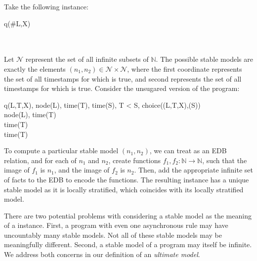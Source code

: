 \begin{example}
Take the following \lang instance:

\begin{Drules}
        {q(\#L,X)} \\
   \\
   \\
\end{Drules}

Let $\mathcal{N}$ represent the set of all infinite subsets of $\mathbb{N}$.  The possible stable models are exactly the elements $(n_1, n_2) \in \mathcal{N} \times \mathcal{N}$, where the first coordinate represents the set of all timestamps for which  is true, and second represents the set of all timestamps for which  is true.  Consider the unsugared version of the program:

\begin{Drules}
        {q(L,T,X), node(L), time(T), time(S), T < S, choice((L,T,X),(S))} \\
        {node(L), time(T)} \\
        {time(T)} \\
        {time(T)}
\end{Drules}

To compute a particular stable model $(n_1,n_2)$, we can treat  as an EDB relation, and for each of $n_1$ and $n_2$, create functions $f_1, f_2 : \mathbb{N} \rightarrow \mathbb{N}$, such that the image of $f_1$ is $n_1$, and the image of $f_2$ is $n_2$.  Then, add the appropriate infinite set of  facts to the EDB to encode the functions.  The resulting instance has a unique stable model as it is locally stratified, which coincides with its locally stratified model.
\end{example}


There are two potential problems with considering a stable model as the meaning of a \lang instance.  
First, a program with even one asynchronous rule may have uncountably many stable models.  
Not all of these stable models may be meaningfully different.  Second, a stable model of a \lang program may itself be infinite.  We address both concerns in our definition of an {\em ultimate model}.

